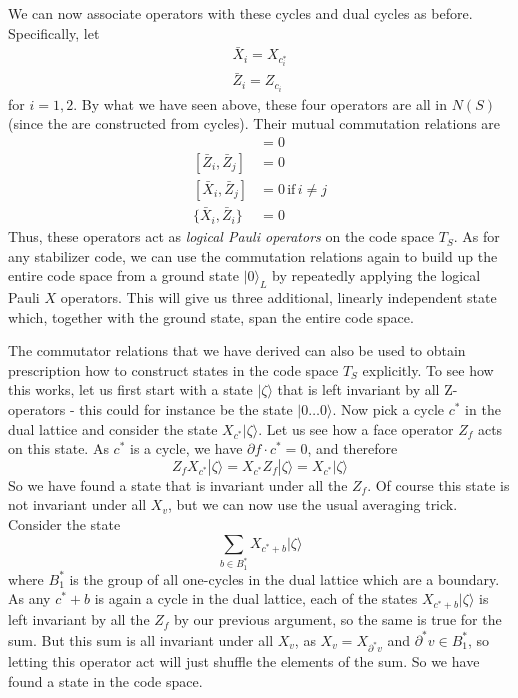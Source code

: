 \documentclass[a4paper, draft]{article}
\theoremstyle{own}
\theoremstyle{remark}
\begin{document}
We can now associate operators with these cycles and dual cycles as before. Specifically, let
\begin{align*}
\bar{X}_i = X_{c^*_i} \\
\bar{Z}_i = Z_{c_i} 
\end{align*}
for $i = 1,2$. By what we have seen above, these four operators are all in $N(S)$ (since the are constructed from cycles). Their mutual commutation relations are
\begin{align*}
[\bar{X}_i, \bar{X}_j] &= 0 \\
[\bar{Z}_i, \bar{Z}_j] &= 0 \\
[\bar{X}_i, \bar{Z}_j] &= 0 \, \text{if} \, i \neq j  \\
\{ \bar{X}_i, \bar{Z}_i \} &= 0 
\end{align*}
Thus, these operators act as \emph{logical Pauli operators} on the code space $T_S$. As for any stabilizer code, we can use the commutation relations again to build up the entire code space from a ground state $|0 \rangle_L$ by repeatedly applying the logical Pauli $X$ operators. This will give us three additional, linearly independent state which, together with the ground state, span the entire code space. 

The commutator relations that we have derived can also be used to obtain prescription how to construct states in the code space $T_S$ explicitly. To see how this works, let us first start with a state $|\zeta \rangle$ that is left invariant by all Z-operators - this could for instance be the state $| 0 \dots 0 \rangle$. Now pick a cycle $c^*$ in the dual lattice and consider the state $X_{c^*} |\zeta \rangle$. Let us see how a face operator $Z_f$ acts on this state. As $c^*$ is a cycle, we have $\partial f \cdot c^* = 0$, and therefore
$$
Z_f X_{c^*} |\zeta \rangle = X_{c^*} Z_f |\zeta \rangle = X_{c^*} |\zeta \rangle
$$
So we have found a state that is invariant under all the $Z_f$. Of course this state is not invariant under all $X_v$, but we can now use the usual averaging trick. Consider the state
$$
\sum_{b \in B_1^*} X_{c^* + b} |\zeta \rangle
$$
where $B_1^*$ is the group of all one-cycles in the dual lattice which are a boundary. As any $c^* + b$ is again a cycle in the dual lattice, each of the states $X_{c^* + b} |\zeta \rangle$ is left invariant by all the $Z_f$ by our previous argument, so the same is true for the sum. But this sum is all invariant under all $X_v$, as $X_v = X_{\partial^* v}$ and $\partial^*v \in B_1^*$, so letting this operator act will just shuffle the elements of the sum. So we have found a state in the code space. 
\end{document}
